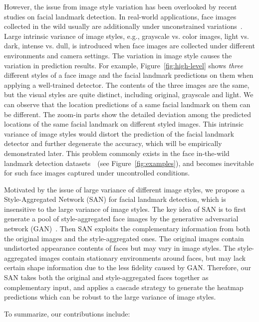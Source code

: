 \documentclass[10pt,twocolumn,letterpaper]{article}
\begin{document}
However, the issue from image style variation has been overlooked by recent studies on facial landmark detection.
In real-world applications, face images collected in the wild usually are additionally under unconstrained variations~\cite{sagonas2013300,zhu2016unconstrained}.
Large intrinsic variance of image styles, e.g., grayscale vs. color images, light vs. dark, intense vs. dull, is introduced when face images are collected under different environments and camera settings.
The variation in image style causes the variation in prediction results.
For example, Figure~\ref{fig:high-level} shows \emph{three} different styles of a face image and the facial landmark predictions on them when applying a well-trained detector.
The contents of the three images are the same, but the visual styles are quite distinct, including original, grayscale and light.
We can observe that the location predictions of a same facial landmark on them can be different.
The zoom-in parts show the detailed deviation among the predicted locations of the same facial landmark on different styled images.
This intrinsic variance of image styles would distort the prediction of the facial landmark detector and further degenerate the accuracy, which will be empirically demonstrated later.
This problem commonly exists in the face in-the-wild landmark detection datasets~\cite{koestinger2011annotated,sagonas2013300}~(see Figure~\ref{fig:examples}), and becomes inevitable for such face images captured under uncontrolled conditions.


Motivated by the issue of large variance of different image styles, we propose a Style-Aggregated Network (SAN) for facial landmark detection, which is insensitive to the large variance of image styles.
The key idea of SAN is to first generate a pool of style-aggregated face images by the generative adversarial network (GAN)~\cite{goodfellow2014generative}.
Then SAN exploits the complementary information from both the original images and the style-aggregated ones.
The original images contain undistorted appearance contents of faces but may vary in image styles.
The style-aggregated images contain stationary environments around faces, but may lack certain shape information due to the less fidelity caused by GAN.
Therefore, our SAN takes both the original and style-aggregated faces together as complementary input, and applies a cascade strategy to generate the heatmap predictions which can be robust to the large variance of image styles.


To summarize, our contributions include:
\end{document}
